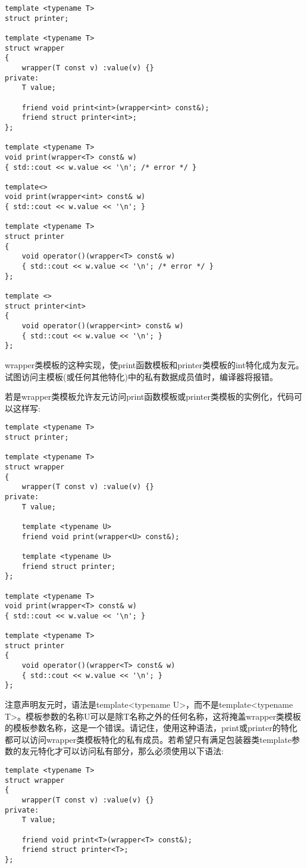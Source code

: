 \begin{lstlisting}[style=styleCXX]
template <typename T>
struct printer;

template <typename T>
struct wrapper
{
	wrapper(T const v) :value(v) {}
private:
	T value;
	
	friend void print<int>(wrapper<int> const&);
	friend struct printer<int>;
};

template <typename T>
void print(wrapper<T> const& w)
{ std::cout << w.value << '\n'; /* error */ }

template<>
void print(wrapper<int> const& w)
{ std::cout << w.value << '\n'; }

template <typename T>
struct printer
{
	void operator()(wrapper<T> const& w)
	{ std::cout << w.value << '\n'; /* error */ }
};

template <>
struct printer<int>
{
	void operator()(wrapper<int> const& w)
	{ std::cout << w.value << '\n'; }
};
\end{lstlisting}

wrapper类模板的这种实现，使print函数模板和printer类模板的int特化成为友元。试图访问主模板(或任何其他特化)中的私有数据成员值时，编译器将报错。

若是wrapper类模板允许友元访问print函数模板或printer类模板的实例化，代码可以这样写:

\begin{lstlisting}[style=styleCXX]
template <typename T>
struct printer;

template <typename T>
struct wrapper
{
	wrapper(T const v) :value(v) {}
private:
	T value;
	
	template <typename U>
	friend void print(wrapper<U> const&);
	
	template <typename U>
	friend struct printer;
};

template <typename T>
void print(wrapper<T> const& w)
{ std::cout << w.value << '\n'; }

template <typename T>
struct printer
{
	void operator()(wrapper<T> const& w)
	{ std::cout << w.value << '\n'; }
};
\end{lstlisting}

注意声明友元时，语法是template<typename U>，而不是template<typename T>。模板参数的名称U可以是除T名称之外的任何名称，这将掩盖wrapper类模板的模板参数名称，这是一个错误。请记住，使用这种语法，print或printer的特化都可以访问wrapper类模板特化的私有成员。若希望只有满足包装器类template参数的友元特化才可以访问私有部分，那么必须使用以下语法:

\begin{lstlisting}[style=styleCXX]
template <typename T>
struct wrapper
{
	wrapper(T const v) :value(v) {}
private:
	T value;
	
	friend void print<T>(wrapper<T> const&);
	friend struct printer<T>;
};
\end{lstlisting}

